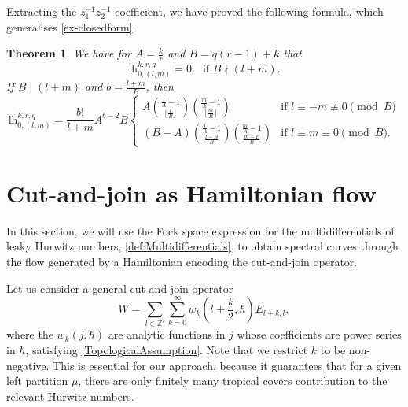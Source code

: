 \documentclass[10pt,a4paper,oneside,no-math,reqno]{amsart}%
\theoremstyle{plain}
\newtheorem{theorem}{Theorem}[section]
\theoremstyle{definition}
\theoremstyle{remark}
\numberwithin{equation}{section}
\newcommand{\mb}[1]{\mathbb{#1}}
\newcommand{\1}{\mathds{1}}
\newcommand{\Z}{\mb{Z}}
\newcommand{\<}{\langle}
\renewcommand{\>}{\rangle}
\newcommand{\lh}{\mathord{\mathrm{l\!h}}}
\begin{document}
Extracting the $z_1^{-1}z_2^{-1}$ coefficient, we have proved the following formula, which generalises \cref{ex-closedform}.

\begin{theorem}
    We have for $A = \frac{k}{r}$ and $B = q(r-1)+k$ that
    \begin{equation}
        \lh_{0,(l,m)}^{k,r,q}=0
        \quad\textrm{if }B\nmid(l+m).
    \end{equation}
    If $B\mid(l+m)$ and $b=\frac{l+m}{B}$, then
    \begin{equation}
        \lh_{0,(l,m)}^{k,r,q}
        =\frac{b!}{l+m} A^{b-2} B \begin{cases}
            A \binom{\frac{l}{A} - 1}{ \lfloor \frac{l}{B} \rfloor } \binom{\frac{m}{A} - 1}{ \lfloor \frac{m}{B} \rfloor } &\textrm{if $l\equiv - m \not\equiv 0 \pmod{B}$}\\           
            (B - A) \binom{\frac{l}{A} - 1}{\frac{l-B}{B}} \binom{\frac{m}{A} - 1}{\frac{m-B}{B}} &\textrm{if $l \equiv m \equiv 0\pmod{B}$}.
        \end{cases}
    \end{equation}
\end{theorem}


\section{Cut-and-join as Hamiltonian flow}
\label{CJSection}

In this section, we will use the Fock space expression for the multidifferentials of leaky Hurwitz numbers, \cref{def:Multidifferentials}, to obtain spectral curves through the flow generated by a Hamiltonian encoding the cut-and-join operator.

Let us consider a general cut-and-join operator
\begin{equation}
	W
	=
	\sum_{l \in \Z'} \sum_{k = 0}^\infty w_k (l + \frac{k}{2} ,\hbar) E_{l + k,l} ,
\end{equation}
where the $ w_k (j, \hbar)$ are analytic functions in $ j$ whose coefficients are power series in $ \hbar$, satisfying \cref{TopologicalAssumption}. Note that we restrict $ k $ to be non-negative. This is essential for our approach, because it guarantees that for a given left partition $ \mu$, there are only finitely many tropical covers contribution to the relevant Hurwitz numbers.

\end{document}

